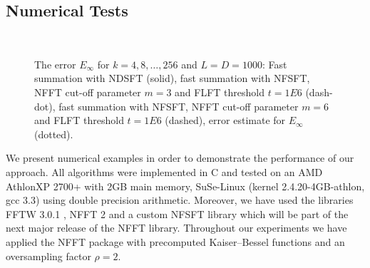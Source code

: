 \subsection{Numerical Tests}

\begin{figure}[tb]
  \centering
  \hfill
  \\
  \caption{The error $E_{\infty}$ for $k = 4,8,\ldots,256$ and $L = D = 1000$: 
  Fast summation with NDSFT (solid), fast summation with NFSFT, 
  NFFT cut-off parameter $m = 3$ and FLFT threshold $t = 1E6$ (dash-dot), 
  fast summation with NFSFT, NFFT cut-off 
  parameter $m = 6$ and FLFT threshold $t = 1E6$ (dashed), error estimate for 
  $E_{\infty}$ (dotted).}
  \label{fig:error}
\end{figure}

We present numerical examples in order to demonstrate the performance of
our approach. All algorithms were implemented in C and tested on an 
AMD Athlon\texttrademark XP 2700+ with 2GB main memory, SuSe-Linux 
(kernel 2.4.20-4GB-athlon, gcc 3.3) using double precision arithmetic. 
Moreover, we have used the libraries FFTW 3.0.1 \cite{fftw}, NFFT 2
\cite{kupo02C} and a custom NFSFT library which will be part of the next 
major release of the NFFT library. Throughout our experiments we have 
applied the NFFT package \cite{kupo02C} with precomputed Kaiser--Bessel 
functions and an oversampling factor $\rho=2$.

